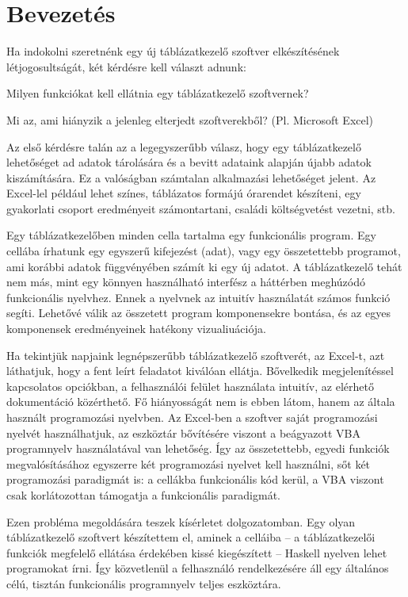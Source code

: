 \chapter{Bevezetés} %
\label{ch:intro}

Ha indokolni szeretnénk egy új táblázatkezelő szoftver elkészítésének létjogosultságát, két kérdésre kell választ adnunk:
\begin{compactenum}
	\item Milyen funkciókat kell ellátnia egy táblázatkezelő szoftvernek?
	\item Mi az, ami hiányzik a jelenleg elterjedt szoftverekből? (Pl. Microsoft Excel)
\end{compactenum}

Az első kérdésre talán az a legegyszerűbb válasz, hogy egy táblázatkezelő lehetőséget ad adatok tárolására és a bevitt adataink alapján újabb adatok kiszámítására. Ez a valóságban számtalan alkalmazási lehetőséget jelent. Az Excel-lel például lehet színes, táblázatos formájú órarendet készíteni, egy gyakorlati csoport eredményeit számontartani, családi költségvetést vezetni, stb. 

Egy táblázatkezelőben minden cella tartalma egy funkcionális program. Egy cellába írhatunk egy egyszerű kifejezést (adat), vagy egy összetettebb programot, ami korábbi adatok függvényében számít ki egy új adatot. A táblázatkezelő tehát nem más, mint egy könnyen használható interfész a háttérben meghúzódó funkcionális nyelvhez. Ennek a nyelvnek az intuitív használatát számos funkció segíti. Lehetővé válik az összetett program komponensekre bontása, és az egyes komponensek eredményeinek hatékony vizualiuációja.

Ha tekintjük napjaink legnépszerűbb táblázatkezelő szoftverét, az Excel-t, azt láthatjuk, hogy a fent leírt feladatot kiválóan ellátja. Bővelkedik megjelenítéssel kapcsolatos opciókban, a felhasználói felület használata intuitív, az elérhető dokumentáció közérthető. Fő hiányosságát nem is ebben látom, hanem az általa használt programozási nyelvben. Az Excel-ben a szoftver saját programozási nyelvét használhatjuk, az eszköztár bővítésére viszont a beágyazott VBA programnyelv használatával van lehetőség. Így az összetettebb, egyedi funkciók megvalósításához egyszerre két programozási nyelvet kell használni, sőt két programozási paradigmát is: a cellákba funkcionális kód kerül, a VBA viszont csak korlátozottan támogatja a funkcionális paradigmát. 

Ezen probléma megoldására teszek kísérletet dolgozatomban. Egy olyan táblázatkezelő szoftvert készítettem el, aminek a celláiba -- a táblázatkezelői funkciók megfelelő ellátása érdekében kissé kiegészített -- Haskell nyelven lehet programokat írni. Így közvetlenül a felhasználó rendelkezésére áll egy általános célú, tisztán funkcionális programnyelv teljes eszköztára.